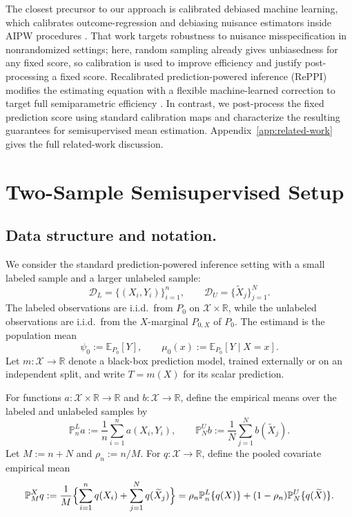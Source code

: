 \documentclass{article}
\theoremstyle{plain}
\theoremstyle{definition}
\newcommand{\E}{\mathbb{E}}
\newcommand{\1}{\mathbf{1}}
\newcommand{\Pl}{\mathbb{P}^{L}_n}
\newcommand{\Pu}{\mathbb{P}^{U}_N}
\newcommand{\Pmx}{\mathbb{P}^{X}_M}
\newcommand{\Px}{P_{0,X}}
\begin{document}
The closest precursor to our approach is calibrated debiased machine learning,
which calibrates outcome-regression and debiasing nuisance estimators inside
AIPW procedures \citep{van2024automatic}. That work targets robustness to
nuisance misspecification in nonrandomized settings; here, random sampling
already gives unbiasedness for any fixed score, so calibration is used to
improve efficiency and justify post-processing a fixed score. Recalibrated
prediction-powered inference (RePPI) modifies the estimating equation with a flexible
machine-learned correction to target full semiparametric efficiency
\citep{ji2025predictions}. In contrast, we post-process the fixed prediction
score using standard calibration maps and characterize the resulting guarantees
for semisupervised mean estimation. Appendix~\ref{app:related-work} gives the
full related-work discussion.

\section{Two-Sample Semisupervised Setup}
\label{sec:setup}

\subsection{Data structure and notation.}
We consider the standard prediction-powered inference setting with a small
labeled sample and a larger unlabeled sample:
\[
\mathcal D_L=\{(X_i,Y_i)\}_{i=1}^n,
\qquad
\mathcal D_U=\{\widetilde X_j\}_{j=1}^N .
\]
The labeled observations are i.i.d.\ from \(P_0\) on
\(\mathcal X\times\mathbb R\), while the unlabeled observations are i.i.d.\
from the \(X\)-marginal \(\Px\) of \(P_0\). The estimand is the population mean
\[
\psi_0:=\E_{P_0}[Y],
\qquad
\mu_0(x):=\E_{P_0}[Y\mid X=x].
\]
Let \(m:\mathcal X\to\mathbb R\) denote a black-box prediction model, trained
externally or on an independent split, and write \(T=m(X)\) for its scalar
prediction.

For functions \(a:\mathcal X\times\mathbb R\to\mathbb R\) and \(b:\mathcal X\to\mathbb R\), define the empirical means over the labeled and unlabeled samples by
\[
\Pl a := \frac{1}{n}\sum_{i=1}^n a(X_i,Y_i),
\qquad
\Pu b := \frac{1}{N}\sum_{j=1}^N b(\widetilde X_j).
\]
Let \(M:=n+N\) and \(\rho_n:=n/M\). For \(q:\mathcal X\to\mathbb R\), define the pooled covariate empirical mean
\[
\Pmx q
:=
\frac{1}{M}\Bigl\{\sum_{i=1}^n q(X_i)+\sum_{j=1}^N q(\widetilde X_j)\Bigr\}
=
\rho_n \Pl\{q(X)\}+(1-\rho_n)\Pu\{q(\widetilde X)\}.
\]
\end{document}
